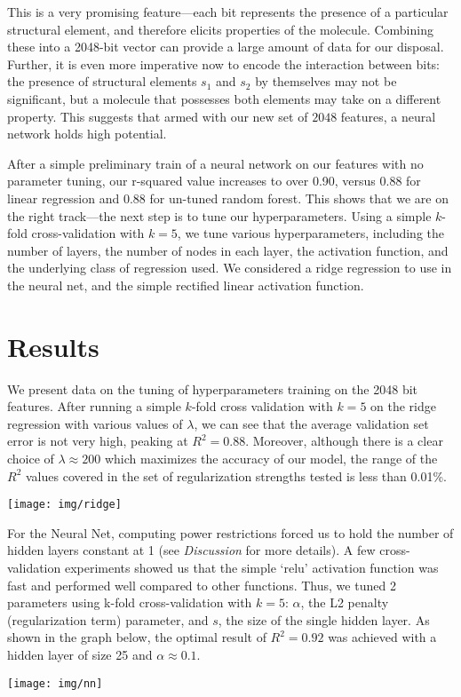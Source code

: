 \documentclass[12pt]{article}
\begin{document}
This is a very promising feature---each bit represents the presence of a particular structural element, and therefore elicits properties of the molecule. Combining these into a 2048-bit vector can provide a large amount of data for our disposal. Further, it is even more imperative now to encode the interaction between bits: the presence of structural elements $s_1$ and $s_2$ by themselves may not be significant, but a molecule that possesses both elements may take on a different property. This suggests that armed with our new set of $2048$ features, a neural network holds high potential. 

After a simple preliminary train of a neural network on our features with no parameter tuning, our r-squared value increases to over 0.90, versus 0.88 for linear regression and 0.88 for un-tuned random forest. This shows that we are on the right track---the next step is to tune our hyperparameters. Using a simple $k$-fold cross-validation with $k = 5$, we tune various hyperparameters, including the number of layers, the number of nodes in each layer, the activation function, and the underlying class of regression used. We considered a ridge regression to use in the neural net, and the simple rectified linear activation function. 

\section{Results}

We present data on the tuning of hyperparameters training on the 2048 bit features. After running a simple $k$-fold cross validation with $k=5$ on the ridge regression with various values of $\lambda$, we can see that the average validation set error is not very high, peaking at $R^2 = 0.88$. Moreover, although there is a clear choice of $\lambda \approx 200$ which maximizes the accuracy of our model, the range of the $R^2$ values covered in the set of regularization strengths tested is less than 0.01\%. 
\begin{center}
	\texttt{[image: img/ridge]}
\end{center}

For the Neural Net, computing power restrictions forced us to hold the number of hidden layers constant at 1 (see \textit{Discussion} for more details). A few cross-validation experiments showed us that the simple `relu' activation function was fast and performed well compared to other functions. Thus, we tuned 2 parameters using k-fold cross-validation with $k=5$: $\alpha$, the L2 penalty (regularization term) parameter, and $s$, the size of the single hidden layer. As shown in the graph below, the optimal result of $R^2 = 0.92$ was achieved with a hidden layer of size 25 and $\alpha \approx 0.1$.
\begin{center}
	\texttt{[image: img/nn]}
\end{center}
\end{document}
